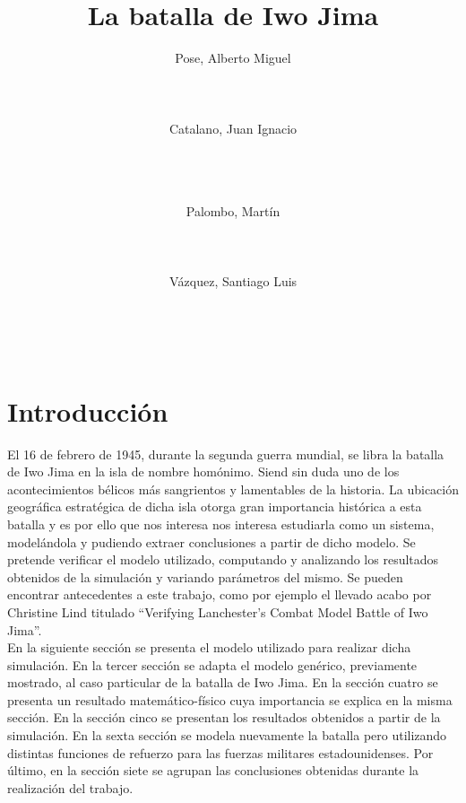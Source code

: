 \documentclass{sig-alternate}
\title{La batalla de Iwo Jima}
\author{
\alignauthor
Pose, Alberto Miguel\\
       \affaddr{ITBA}\\
       \affaddr{Madero 399}\\
       \affaddr{Buenos Aires, Argentina}\\
       \email{apose@alu.itba.edu.ar}
\alignauthor
Catalano, Juan Ignacio\\
       \affaddr{ITBA}\\
       \affaddr{Madero 399}\\
       \affaddr{Buenos Aires, Argentina}\\
       \email{jcatalan@alu.itba.edu.ar}
\and
\alignauthor 
Palombo, Martín\\
       \affaddr{ITBA}\\
       \affaddr{Madero 399}\\
       \affaddr{Buenos Aires, Argentina}\\
       \email{mpalombo@alu.itba.edu.ar}
\alignauthor 
Vázquez, Santiago Luis\\
       \affaddr{ITBA}\\
       \affaddr{Madero 399}\\
       \affaddr{Buenos Aires, Argentina}\\
       \email{savazque@alu.itba.edu.ar}
}
\date{}
\begin{document}
\maketitle


\newpage

\section{Introducci\'on}

El 16 de febrero de 1945, durante la segunda guerra mundial, se libra la batalla de Iwo Jima en la isla de nombre homónimo. 
Siend sin duda uno de los acontecimientos bélicos más sangrientos y lamentables de la historia. La ubicación geográfica estratégica de dicha
isla otorga gran importancia histórica a esta batalla y es por ello que nos interesa nos interesa estudiarla como un sistema, modelándola y 
pudiendo extraer conclusiones a partir de dicho modelo. Se pretende verificar el modelo utilizado,
computando y analizando los resultados obtenidos de la simulación y variando parámetros del mismo. Se pueden encontrar antecedentes a este 
trabajo, como por ejemplo el llevado acabo por Christine Lind titulado ``Verifying Lanchester’s Combat Model Battle of Iwo Jima''. \\ 
En la siguiente secci\'on se presenta el modelo utilizado para realizar dicha simulaci\'on. En la tercer secci\'on se adapta el modelo genérico,
previamente mostrado, al caso particular de la batalla de Iwo Jima. En la sección cuatro se presenta un resultado matem\'atico-f\'isico cuya 
importancia se explica en la misma secci\'on. En la secci\'on cinco se presentan los resultados obtenidos a partir de la simulaci\'on. En la
sexta sección se modela nuevamente la batalla pero utilizando distintas funciones de refuerzo para las fuerzas militares estadounidenses.
Por \'ultimo, en la secci\'on siete se agrupan las conclusiones obtenidas durante la realizaci\'on del trabajo.
\end{document}
